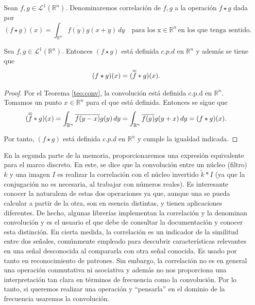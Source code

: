 \begin{definicion}
Sean $f,g \in \mathscr{L}^1(\mathbb{R}^n)$. Denominaremos correlación de $f,g$ a la operación $f \star g$ dada por 
\begin{equation}
     (f \star g)(x) = \int_{\mathbb{R}^n} \overline{f(y)}g(x+y)\, dy \quad \text{para los x} \in \mathbb{R}^n \,\text{en los que tenga sentido} .
\end{equation}
\end{definicion}

\begin{proposicion}
Sea $f,g \in \mathscr{L}^1(\mathbb{R}^n)$. Entonces $(f \star g)$ está definida $c.p.d$ en $\mathbb{R}^n$ y además se tiene que
\begin{equation}
  (f \star g)(x) = (\overline{\widetilde{f\vphantom{g}}}\ast g)(x).
\end{equation}
\end{proposicion}
\begin{proof}

Por el Teorema \ref{teo:conv}, la convolución está definida c.p.d en $\mathbb{R}^n$. Tomamos un punto $x \in \mathbb{R}^n$ para el que está definida. Entonces se sigue que
\begin{equation}
(\overline{\widetilde{f\vphantom{g}}}\ast g)(x) =  \int_{\mathbb{R}^n} \overline{f(y-x)}g(y) \,dy =  \int_{\mathbb{R}^n} \overline{f(y)}g(y+x) \,dy = (f \star g)(x).
\end{equation}

\noindent Por tanto, $(f \star g)$ está definida $c.p.d$ en $\mathbb{R}^n$ y cumple la igualdad indicada.
\end{proof}

\noindent En la segunda parte de la memoria, proporcionaremos una expresión equivalente para el marco discreto. 
En este, se dice que la convolución entre un núcleo (filtro) $k$ y una imagen $I$ es realizar la correlación con el núcleo invertido $\widetilde{k}*I$ (ya que la conjugación no es necesaria, al trabajar con números reales). Es interesante conocer la naturaleza de estas dos operaciones ya que, aunque una se pueda calcular a partir de la otra,  son en esencia distintas, y tienen aplicaciones diferentes. De hecho, algunas librerías implementan la correlación y la denominan convolución y es el usuario el que debe de consultar la documentación y conocer esta distinción.
En cierta medida, la correlación es un indicador de la similitud entre dos señales, comúnmente empleado para descubrir características relevantes en una señal desconocida al compararla con otra señal conocida. Es usado por tanto en reconocimiento de patrones. Sin embargo, la correlación no es en general una operación conmutativa ni asociativa y además no nos proporciona una interpretación tan clara en términos de frecuencia como la convolución. Por lo tanto, si queremos realizar una operación y ``pensarla'' en el dominio de la frecuencia usaremos la convolución. 



